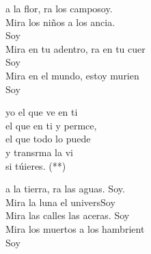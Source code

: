 \begin{cancion}[Soy yo][Almudena]%
	a la flor, ra los camposoy.\\
	Mira los niños a los ancia. \\
	Soy \\
	Mira en tu adentro, ra en tu cuer\\
	Soy \\
	Mira en el mundo,  estoy murien \\
	Soy \jump\\
	\begin{chorus}%
		 yo el que ve en ti\\
		el que  en ti y permce,\\
		el que todo lo puede \\
		y transrma la vi\\
		si túieres. (**)\jump\\
	\end{chorus}%
	a la tierra, ra las aguas. Soy.\\
	Mira la luna el universSoy \\
	Mira las calles las aceras. Soy \\
	Mira los muertos a los hambrient\\
	Soy \\
\end{cancion}%

